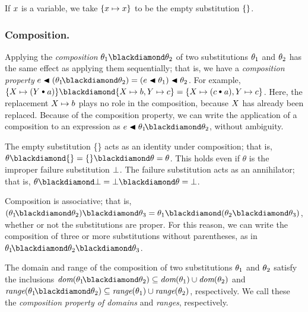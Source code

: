 \documentclass[runningheads]{llncs}
\begin{document}
If $x$ is a variable, we take $\{x \mapsto x\}$ to be the empty substitution $\{\}$. 

\subsubsection{Composition.} Applying  the \emph{composition} $\expsub {\theta}{1} \compose \thet{2}$ of two substitutions $\theta_{1}$ and $\theta_{2}$ has the same effect as applying them sequentially;  that is, we have a \emph{composition property} $e \apply (\thet{1}\! \compose \thet{2}) = (e \apply \thet{1}) \apply \thet{2} $. For example,
$\{\var{X} \mapsto (\var{Y} \cons a)\} \compose \{\var{X} \mapsto b, \var{Y} \mapsto c\} = \{\var{X} \mapsto (c \cons a), \var{Y} \mapsto c\}$.  Here, the replacement $X \mapsto b$ plays no role in the composition, because $X$ has already been replaced. Because of the composition property, we can write the application of a composition to an expression as $e \apply \thet{1}\! \compose \thet{2}$, without ambiguity.

The empty substitution \{\} acts as an identity under composition;  that is,  $\theta \compose \{\} = \{\} \compose \theta = \theta$. This holds even if $\theta$ is the improper failure substitution $\bot$. The failure substitution acts as an annihilator; that is,  $\theta \compose \fail = \fail \compose \theta = \fail$.

 Composition is associative; that is, $(\thet{1}\! \compose \thet{2}) \compose \thet{3}  = \thet{1} \compose (\thet{2} \compose \thet{3})$, whether or not the substitutions are proper.   For this reason, we can write the composition of three or more substitutions without parentheses, as in $\thet{1}\! \compose \thet{2} \compose \thet{3}$.

 The domain and range of the composition of two substitutions $\theta_{1}$ and $\theta_{2}$ satisfy the inclusions 
 $\dom(\thet{1}\! \compose \thet{2})  \subseteq  \dom(\thet{1}) \cup \dom(\thet{2})$ and  $\range(\thet{1}\! \compose \thet{2})  \subseteq  \range(\thet{1}) \cup \range(\thet{2})$, respectively.  We call these the \emph{composition property of domains}  and \emph{ranges}, respectively.
 
\end{document}
